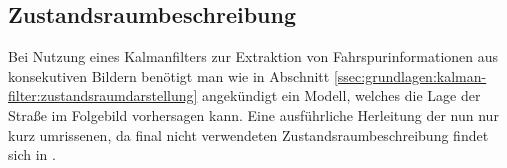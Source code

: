 \subsection{Zustandsraumbeschreibung}
\label{ssec:polynombasierte:kalman:zustandsraumbeschreibung}
Bei Nutzung eines Kalmanfilters zur Extraktion von Fahrspurinformationen aus konsekutiven Bildern benötigt man wie in Abschnitt \ref{ssec:grundlagen:kalman-filter:zustandsraumdarstellung} angekündigt ein Modell, welches die Lage der Straße im Folgebild vorhersagen kann. Eine ausführliche Herleitung der nun nur kurz umrissenen, da final nicht verwendeten Zustandsraumbeschreibung findet sich in \autocite[47-50]{petersfalkoFPGAbasierteBildverarbeitungspipelineZur2009}.



